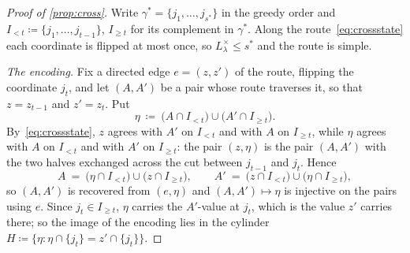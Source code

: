 \begin{proof}[Proof of \cref{prop:cross}]
    Write $\gamma^{\ast}=\{j_1,\dots,j_{s^{\ast}}\}$ in the greedy order and
    $I_{<t}\coloneq\{j_1,\dots,j_{t-1}\}$, $I_{\geq t}$ for its complement in
    $\gamma^{\ast}$. Along the route~\eqref{eq:crossstate} each coordinate is
    flipped at most once, so $L^{\times}_\lambda\leq s^{\ast}$ and the route
    is simple.

    \emph{The encoding.} Fix a directed edge $e=(z,z')$ of the route,
    flipping the coordinate $j_t$, and let $(A,A')$ be a pair whose route
    traverses it, so that $z=z_{t-1}$ and $z'=z_t$. Put
    \begin{equation}
        \label{eq:etadef}
        \eta\ \coloneq\ \bigl(A\cap I_{<t}\bigr)\cup
        \bigl(A'\cap I_{\geq t}\bigr) .
    \end{equation}
    By~\eqref{eq:crossstate}, $z$ agrees with $A'$ on $I_{<t}$ and with $A$
    on $I_{\geq t}$, while $\eta$ agrees with $A$ on $I_{<t}$ and with $A'$
    on $I_{\geq t}$: the pair $(z,\eta)$ is the pair $(A,A')$ with the two
    halves exchanged across the cut between $j_{t-1}$ and $j_t$. Hence
    \begin{equation}
        \label{eq:recover}
        A\ =\ \bigl(\eta\cap I_{<t}\bigr)\cup\bigl(z\cap I_{\geq t}\bigr),
        \qquad
        A'\ =\ \bigl(z\cap I_{<t}\bigr)\cup\bigl(\eta\cap I_{\geq t}\bigr),
    \end{equation}
    so $(A,A')$ is recovered from $(e,\eta)$ and $(A,A')\mapsto\eta$ is
    injective on the pairs using $e$. Since $j_t\in I_{\geq t}$, $\eta$
    carries the $A'$-value at $j_t$, which is the value $z'$ carries there;
    so the image of the encoding lies in the cylinder
    $H\coloneq\{\eta:\eta\cap\{j_t\}=z'\cap\{j_t\}\}$.


\end{proof}
